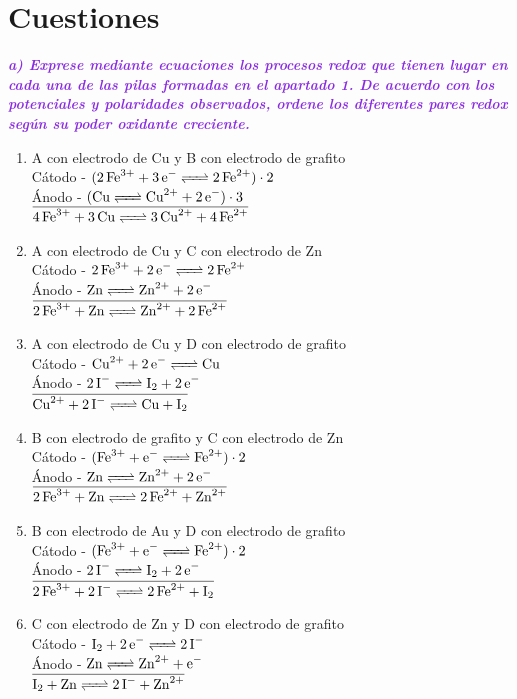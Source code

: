 \clearpage
\section{Cuestiones}
\noindent\textcolor{BlueViolet}{\textbf{\textit{a) Exprese mediante ecuaciones los procesos redox que tienen lugar en cada una de las pilas formadas en el apartado 1. De acuerdo con los potenciales y polaridades observados, ordene los diferentes pares redox según su poder oxidante creciente.}}}\\
\begin{enumerate}
\item A con electrodo de Cu y B con electrodo de grafito \\
    Cátodo - $(\ce{2Fe^{3+} + 3e^- <=> 2Fe^{2+}})\cdot 2$ \\
    Ánodo  - $(\ce{Cu <=> Cu^{2+} + 2e^-})\cdot 3$ \\
    $\overline{\ce{4Fe^{3+} + 3Cu <=> 3Cu^{2+} + 4Fe^{2+}}}$
\item A con electrodo de Cu y C con electrodo de Zn \\
    Cátodo - $\ce{2Fe^{3+} + 2e^- <=> 2Fe^{2+}}$ \\
    Ánodo  - $\ce{Zn <=> Zn^{2+} + 2e^-}$ \\
    $\overline{\ce{2Fe^{3+} + Zn <=> Zn^{2+} + 2Fe^{2+}}}$
\item A con electrodo de Cu y D con electrodo de grafito \\
    Cátodo - $\ce{Cu^{2+} + 2e^- <=> Cu}$ \\
    Ánodo  - $\ce{2I^- <=> I2 + 2e^-}$ \\
    $\overline{\ce{Cu^{2+} + 2I^- <=> Cu + I2}}$
\item B con electrodo de grafito y C con electrodo de Zn \\
    Cátodo - $(\ce{Fe^{3+} + e^- <=> Fe^{2+}})\cdot 2$ \\
    Ánodo  - $\ce{Zn <=> Zn^{2+} + 2e^-}$ \\
    $\overline{\ce{2Fe^{3+} + Zn <=> 2Fe^{2+} + Zn^{2+}}}$
\item B con electrodo de Au y D con electrodo de grafito \\
    Cátodo - $(\ce{Fe^{3+} + e^- <=> Fe^{2+}})\cdot 2$ \\
    Ánodo  - $\ce{2I^- <=> I2 + 2e^-}$ \\
    $\overline{\ce{2Fe^{3+} + 2I^- <=> 2Fe^{2+} + I2}}$
\item C con electrodo de Zn y D con electrodo de grafito \\
    Cátodo - $\ce{I2 + 2e^- <=> 2I^-}$ \\
    Ánodo  - $\ce{Zn <=> Zn^{2+} + e^-}$ \\
    $\overline{\ce{I2 + Zn <=> 2I^- + Zn^{2+}}}$
\end{enumerate}
\clearpage

